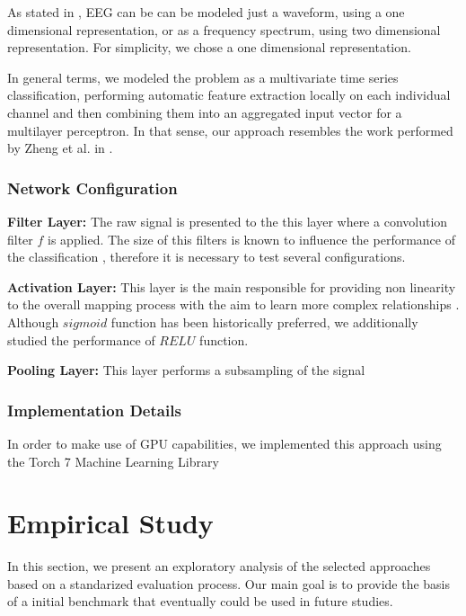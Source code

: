\documentclass{sig-alternate}
\begin{document}
As stated in \cite{stober2014using}, EEG can be can be modeled 
just a waveform, using a one
dimensional representation, or as a frequency spectrum, using 
two dimensional representation. For simplicity, we chose a one
dimensional representation. 

In general terms, we modeled the problem as a multivariate time
 series classification, performing automatic feature extraction 
 locally on each individual channel and then combining them into
  an aggregated input vector for a multilayer perceptron. In that 
  sense, our approach resembles the work performed by Zheng et
  al. in \cite{zheng2014time}.
  
\subsubsection{Network Configuration}

\textbf{Filter Layer:}  The raw signal is presented to the this layer where a 
convolution filter  $f$ is applied. The size of this filters is known to influence 
the performance of the classification \cite{lecun1995convolutional}, therefore it is necessary to test several 
configurations.

\textbf{Activation Layer:} This layer is the main responsible for providing non linearity
to the overall mapping process with the aim to learn more complex relationships
\cite{xing2010brief}.  
Although $sigmoid$ function has been historically preferred, we additionally
 studied the performance of  $RE LU$ function.
 
\textbf{Pooling Layer: } This layer performs a subsampling of the signal 



\subsubsection{Implementation Details}
In order to make use of GPU capabilities, we implemented this approach
using the Torch 7 Machine Learning Library \cite{collobert2011torch7}

\section{Empirical Study}
\label{study}

In this section, we present an  exploratory 
analysis of the selected approaches based on a standarized
evaluation process. Our main goal is to provide the basis
of a initial benchmark that eventually could be used in future
studies.
\end{document}
